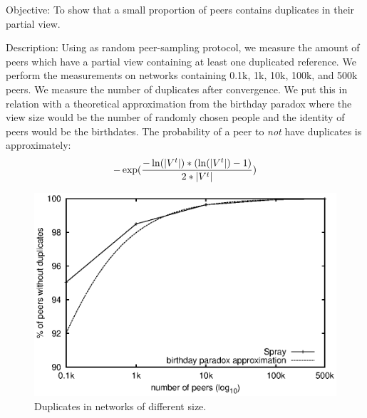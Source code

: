 \begin{asparadesc} 
\item[Objective:] To show that a small proportion of peers contains duplicates
  in their partial view.
\item[Description:] Using \SPRAY as random peer-sampling protocol, we measure
  the amount of peers which have a partial view containing at least one
  duplicated reference. We perform the measurements on networks containing 0.1k,
  1k, 10k, 100k, and 500k peers. We measure the number of duplicates after
  convergence. We put this in relation with a theoretical approximation from the
  birthday paradox where the view size would be the number of randomly chosen
  people and the identity of peers would be the birthdates. The probability of a
  peer to \emph{not} have duplicates is approximately:
  \begin{equation*} 
    -\exp({-\ln(|V^t|)*(\ln(|V^t|)-1)\over{2*|V^t|}})
  \end{equation*}

\begin{figure}
  \centering
  \includegraphics[width=\SCALE\columnwidth]{img/duplicates.eps}
  \caption{\label{fig:duplicates}Duplicates in networks of different size.}
\end{figure}



\end{asparadesc}
